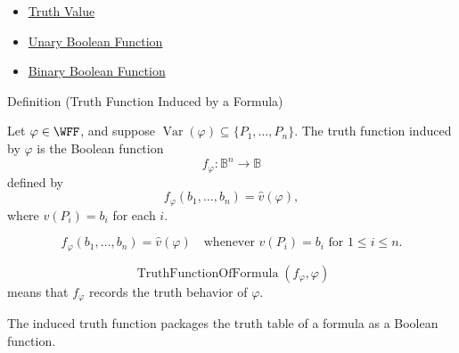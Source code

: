 \begin{dependencies}
\begin{itemize}
  \item \hyperref[def:truth-value-propositional-logic]{Truth Value}
  \item \hyperref[def:unary-boolean-function-propositional-logic]{Unary Boolean Function}
  \item \hyperref[def:binary-boolean-function-propositional-logic]{Binary Boolean Function}
\end{itemize}
\end{dependencies}
\begin{definitionbox}{Definition (Truth Function Induced by a Formula)}
\begin{definition}
\label{def:truth-function-induced-by-formula}
Let \(\varphi\in\WFF\), and suppose \(\operatorname{Var}(\varphi)\subseteq\{P_1,\ldots,P_n\}\). The truth function induced by \(\varphi\) is the Boolean function
\[
f_\varphi:\mathbb{B}^n\to\mathbb{B}
\]
defined by
\[
f_\varphi(b_1,\ldots,b_n)=\widehat v(\varphi),
\]
where \(v(P_i)=b_i\) for each \(i\).
\end{definition}
\end{definitionbox}

\begin{remark*}
\[
f_\varphi(b_1,\ldots,b_n)=\widehat v(\varphi)
\quad
\text{whenever }
v(P_i)=b_i\text{ for }1\le i\le n.
\]
\end{remark*}

\begin{remark*}
\[
\operatorname{TruthFunctionOfFormula}(f_\varphi,\varphi)
\]
means that \(f_\varphi\) records the truth behavior of \(\varphi\).
\end{remark*}

\begin{remark*}[Interpretation]
The induced truth function packages the truth table of a formula as a Boolean function.
\end{remark*}

